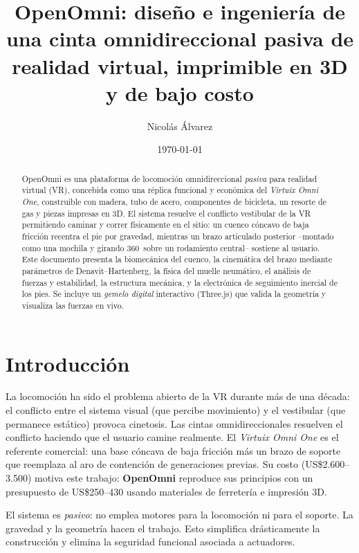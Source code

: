 \documentclass[10pt,twocolumn]{article}
\title{\textbf{OpenOmni}: dise\~no e ingenier\'ia de una cinta omnidireccional
pasiva de realidad virtual, imprimible en 3D y de bajo costo}
\author{Nicol\'as \'Alvarez}
\date{\today}
\providecommand{\SI}[2]{#1\,#2}
\begin{document}
\maketitle

\begin{abstract}
\noindent
OpenOmni es una plataforma de locomoci\'on omnidireccional \emph{pasiva} para realidad
virtual (VR), concebida como una r\'eplica funcional y econ\'omica del \emph{Virtuix
Omni One}, construible con madera, tubo de acero, componentes de bicicleta, un resorte
de gas y piezas impresas en 3D. El sistema resuelve el conflicto vestibular de la VR
permitiendo caminar y correr f\'isicamente en el sitio: un cuenco c\'oncavo de baja
fricci\'on recentra el pie por gravedad, mientras un brazo articulado posterior --montado
como una mochila y girando \SI{360}{\degree} sobre un rodamiento central-- sostiene al
usuario. Este documento presenta la biomec\'anica del cuenco, la cinem\'atica del brazo
mediante par\'ametros de Denavit--Hartenberg, la f\'isica del muelle neum\'atico, el
an\'alisis de fuerzas y estabilidad, la estructura mec\'anica, y la electr\'onica de
seguimiento inercial de los pies. Se incluye un \emph{gemelo digital} interactivo
(Three.js) que valida la geometr\'ia y visualiza las fuerzas en vivo.
\end{abstract}

\section{Introducci\'on}
La locomoci\'on ha sido el problema abierto de la VR durante m\'as de una d\'ecada: el
conflicto entre el sistema visual (que percibe movimiento) y el vestibular (que permanece
est\'atico) provoca cinetosis. Las cintas omnidireccionales resuelven el conflicto
haciendo que el usuario camine realmente. El \emph{Virtuix Omni One} es el referente
comercial: una base c\'oncava de baja fricci\'on m\'as un brazo de soporte que reemplaza
al aro de contenci\'on de generaciones previas. Su costo (US\$2.600--3.500) motiva este
trabajo: \textbf{OpenOmni} reproduce sus principios con un presupuesto de
US\$250--430 usando materiales de ferreter\'ia e impresi\'on 3D.

El sistema es \emph{pasivo}: no emplea motores para la locomoci\'on ni para el soporte.
La gravedad y la geometr\'ia hacen el trabajo. Esto simplifica dr\'asticamente la
construcci\'on y elimina la seguridad funcional asociada a actuadores.
\end{document}
